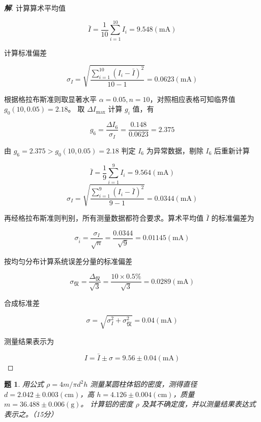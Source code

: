 \documentclass{article}
\newtheorem{problem}{题}
\newenvironment{solution}
{\begin{proof}[\textbf{解}]\renewcommand{\qedsymbol}{}}
{\end{proof}}
\begin{document}
\begin{solution}

计算算术平均值

\[
\bar{I} = \frac{1}{10}\sum_{i=1}^{10} I_i = 9.548(\mathrm{mA})
\]

计算标准偏差

\[
\sigma_I = \sqrt{\frac{\sum_{i=1}^{10} \left(I_i - \bar{I}\right)^2}{10 - 1}} = 0.0623(\mathrm{mA})
\]

根据格拉布斯准则取显著水平 $\alpha = 0.05, n = 10$，对照相应表格可知临界值 $ g_0({10,0.05}) = 2.18 $。
取 $\Delta I_{\max}$ 计算 $g_i$ 值，有

\[
g_6 = \frac{\Delta I_6}{\sigma_I}=\frac{0.148}{0.0623} = 2.375
\]


由 $g_6=2.375 > g_0({10,0.05}) = 2.18$ 判定 $I_6$ 为异常数据，剔除 $I_6$ 后重新计算

\[ \bar{I} = \frac{1}{9}\sum_{i=1}^{9} I_i = 9.564(\mathrm{mA}) \]
\[ \sigma_I = \sqrt{\frac{\sum_{i=1}^{9} \left(I_i - \bar{I}\right)^2}{9 - 1}} = 0.0344(\mathrm{mA}) \]

再经格拉布斯准则判别，所有测量数据都符合要求。算术平均值 $\bar{I}$ 的标准偏差为

\[
{\sigma}_{\bar{{i}}}=\frac{{\sigma}_{I}}{\sqrt{n}}=\frac{{0}.{0344}}{\sqrt{9}}={0}.{01145}(\mathrm{mA})
\]

按均匀分布计算系统误差分量的标准偏差

\[
\sigma_{\text{仪}} = \frac{\Delta_{\text{仪}}}{\sqrt{3}} = \frac{10 \times 0.5\%}{\sqrt{3}} = 0.0289(\mathrm{mA})
\]

合成标准差

\[
\sigma = \sqrt{\sigma_{{I}}^2 + \sigma_{\text{仪}}^2} = 0.04(\mathrm{mA})
\]

测量结果表示为

\[
I = \bar{I} \pm \sigma = 9.56 \pm 0.04(\mathrm{mA})
\]

\end{solution}

\begin{problem}
  用公式 $\rho=4m/ \pi d^2h$ 测量某圆柱体铝的密度，测得直径 $d = 2.042 \pm 0.003 \mathrm{(cm)}$，高 $h = 4.126 \pm 0.004 \mathrm{(cm)}$，质量 $m = 36.488 \pm 0.006 \mathrm{(g)}$。
  计算铝的密度 $\rho$ 及其不确定度，并以测量结果表达式表示之。（15分）
\end{problem}
\end{document}
